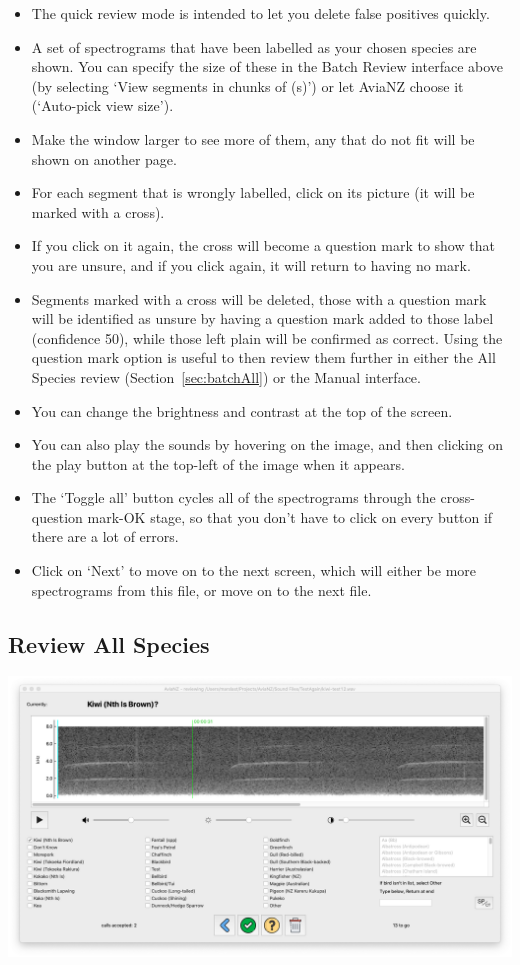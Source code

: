 \documentclass{article}
\begin{document}
\begin{itemize}
\item The quick review mode is intended to let you delete false positives quickly. 
\item A set of spectrograms that have been labelled as your chosen species are shown. You can specify the size of these in the Batch Review interface above (by selecting `View segments in chunks of (s)') or let AviaNZ choose it (`Auto-pick view size').
\item Make the window larger to see more of them, any that do not fit will be shown on another page. 
\item For each segment that is wrongly labelled, click on its picture (it will be marked with a cross). 
\item If you click on it again, the cross will become a question mark to show that you are unsure, and if you click again, it will return to having no mark. 
\item Segments marked with a cross will be deleted, those with a question mark will be identified as unsure by having a question mark added to those label (confidence 50), while those left plain will be confirmed as correct. Using the question mark option is useful to then review them further in either the All Species review (Section~\ref{sec:batchAll}) or the Manual interface.
\item You can change the brightness and contrast at the top of the screen.
\item You can also play the sounds by hovering on the image, and then clicking on the play button at the top-left of the image when it appears. 
\item The `Toggle all' button cycles all of the spectrograms through the cross-question mark-OK stage, so that you don't have to click on every button if there are a lot of errors. 
\item Click on `Next' to move on to the next screen, which will either be more spectrograms from this file, or move on to the next file. 
\end{itemize}

\subsection{Review All Species\label{sec:batchAll}}
\begin{center}
	\includegraphics[width=.95\textwidth]{Figures/BatchReview3}
\end{center}
\end{document}
